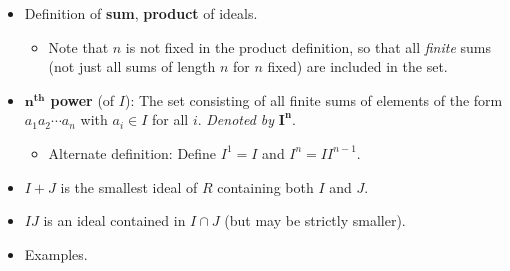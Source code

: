\documentclass[../notes.tex]{subfiles}
\begin{document}
\begin{itemize}
\begin{theorem}
\begin{enumerate}
            \item (The Third Isomorphism Theorem for Rings) Let $I,J$ be ideals of $R$ with $I\subset J$. Then $J/I$ is an ideal of $R/I$ and $(R/I)/(J/I)\cong R/J$.
            \item (The Fourth Isomorphism Theorem for Rings) Let $I$ be an ideal of $R$. The correspondence $A\leftrightarrow A/I$ is an inclusion-preserving bijection between the set of subrings $A$ of $R$ that contain $I$ and the set of subrings of $R/I$. Furthermore, $A$ (a subring containing $I$) is an ideal of $R$ if and only if $A/I$ is an ideal of $R/I$.
        \end{enumerate}
        \begin{proof}
            All proofs follow the same structure: "First use the corresponding theorem from group theory to obtain an isomorphism of \emph{additive groups} (or correspondence of groups, in the case of the Fourth Isomorphism Theorem) and then check that this group isomorphism (or correspondence, respectively) is a multiplicative map, and so defines a \emph{ring} isomorphism. In each case the verification is immediate from the definition of multiplication in quotient rings" \parencite[246]{bib:DummitFoote}.
        \end{proof}
    \end{theorem}
    \item Definition of \textbf{sum}, \textbf{product} of ideals.
    \begin{itemize}
        \item Note that $n$ is not fixed in the product definition, so that all \emph{finite} sums (not just all sums of length $n$ for $n$ fixed) are included in the set.
    \end{itemize}
    \item \textbf{$\bm{n}^\textbf{th}$ power} (of $I$): The set consisting of all finite sums of elements of the form $a_1a_2\cdots a_n$ with $a_i\in I$ for all $i$. \emph{Denoted by} $\bm{I^n}$.
    \begin{itemize}
        \item Alternate definition: Define $I^1=I$ and $I^n=II^{n-1}$.
    \end{itemize}
    \item $I+J$ is the smallest ideal of $R$ containing both $I$ and $J$.
    \item $IJ$ is an ideal contained in $I\cap J$ (but may be strictly smaller).
    \item Examples.
    \begin{enumerate}

\end{enumerate}
\end{itemize}
\end{document}
